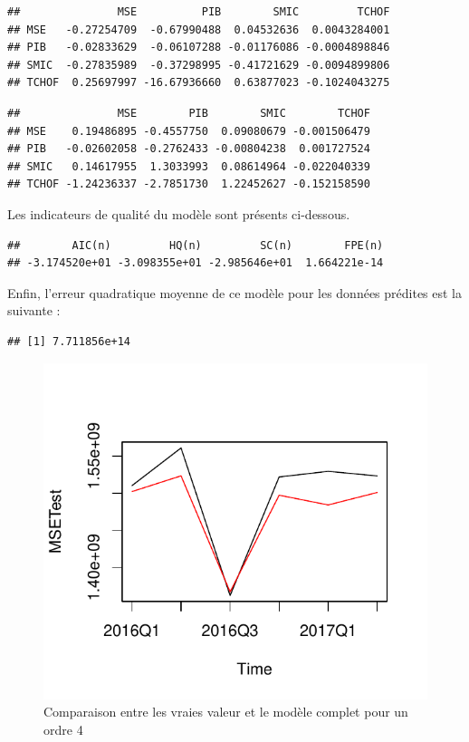 \documentclass[11pt,]{article}
\begin{document}
\begin{verbatim}
##               MSE          PIB        SMIC         TCHOF
## MSE   -0.27254709  -0.67990488  0.04532636  0.0043284001
## PIB   -0.02833629  -0.06107288 -0.01176086 -0.0004898846
## SMIC  -0.27835989  -0.37298995 -0.41721629 -0.0094899806
## TCHOF  0.25697997 -16.67936660  0.63877023 -0.1024043275
\end{verbatim}

\begin{verbatim}
##               MSE        PIB        SMIC        TCHOF
## MSE    0.19486895 -0.4557750  0.09080679 -0.001506479
## PIB   -0.02602058 -0.2762433 -0.00804238  0.001727524
## SMIC   0.14617955  1.3033993  0.08614964 -0.022040339
## TCHOF -1.24236337 -2.7851730  1.22452627 -0.152158590
\end{verbatim}

Les indicateurs de qualité du modèle sont présents ci-dessous.

\begin{verbatim}
##        AIC(n)         HQ(n)         SC(n)        FPE(n) 
## -3.174520e+01 -3.098355e+01 -2.985646e+01  1.664221e-14
\end{verbatim}

Enfin, l'erreur quadratique moyenne de ce modèle pour les données
prédites est la suivante :

\begin{verbatim}
## [1] 7.711856e+14
\end{verbatim}

\begin{figure}[htbp]
\centering
\includegraphics{Rapport_final_files/figure-latex/unnamed-chunk-29-1.pdf}
\caption{\label{fig21} Comparaison entre les vraies valeur et le modèle
complet pour un ordre 4}
\end{figure}
\end{document}
